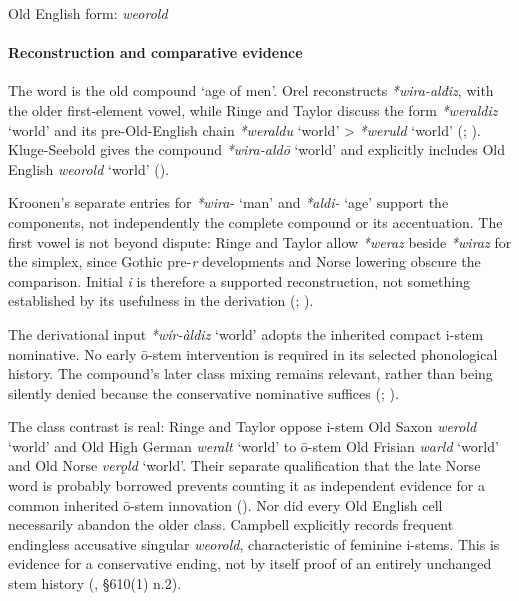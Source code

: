 \documentclass[
  british,
  a4paper,
]{article}
\providecommand{\Recon}[1]{\emph{*#1}}
\begin{document}
Old English form: \emph{weorold}

\paragraph{Reconstruction and comparative
evidence}\label{reconstruction-and-comparative-evidence-82}

The word is the old compound `age of men'. Orel reconstructs
\emph{*wira-alđiz}, with the older first-element vowel, while Ringe and
Taylor discuss the form \Recon{weraldiz} `world' and its pre-Old-English
chain \Recon{weraldu} `world' \textgreater{} \Recon{weruld} `world'
(;
).
Kluge-Seebold gives the compound \Recon{wira-aldō} `world' and
explicitly includes Old English \emph{weorold} `world'
().

Kroonen's separate entries for \emph{*wira-} `man' and \emph{*aldi-}
`age' support the components, not independently the complete compound or
its accentuation. The first vowel is not beyond dispute: Ringe and
Taylor allow \emph{*weraz} beside \emph{*wiraz} for the simplex, since
Gothic pre-\emph{r} developments and Norse lowering obscure the
comparison. Initial \emph{i} is therefore a supported reconstruction,
not something established by its usefulness in the derivation
(;
).

The derivational input \Recon{wír-àldiz} `world' adopts the inherited
compact i-stem nominative. No early ō-stem intervention is required in
its selected phonological history. The compound's later class mixing
remains relevant, rather than being silently denied because the
conservative nominative suffices (; ).

The class contrast is real: Ringe and Taylor oppose i-stem Old Saxon
\emph{werold} `world' and Old High German \emph{weralt} `world' to
ō-stem Old Frisian \emph{warld} `world' and Old Norse \emph{verǫld}
`world'. Their separate qualification that the late Norse word is
probably borrowed prevents counting it as independent evidence for a
common inherited ō-stem innovation (). Nor did every Old English cell necessarily
abandon the older class. Campbell explicitly records frequent endingless
accusative singular \emph{weorold}, characteristic of feminine i-stems.
This is evidence for a conservative ending, not by itself proof of an
entirely unchanged stem history (, §610(1) n.2).
\end{document}
